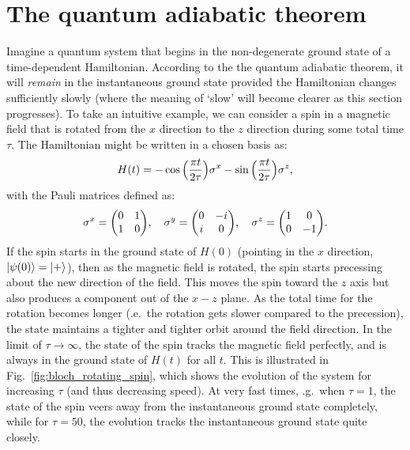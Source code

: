     \section{The quantum adiabatic theorem}\label{sec:2.1_adiabatic_theorem}
    
    Imagine a quantum system that begins in the non-degenerate ground state of a time-dependent Hamiltonian. According to the the quantum adiabatic theorem, it will \emph{remain} in the instantaneous ground state provided the Hamiltonian changes sufficiently slowly (where the meaning of `slow' will become clearer as this section progresses). To take an intuitive example, we can consider a spin in a magnetic field that is rotated from the $x$ direction to the $z$ direction during some total time $\tau$. The Hamiltonian might be written in a chosen basis as:
    \begin{equation}\label{eq:rotating_spin_H}
        H(t) = -\cos\Big(\frac{\pi t}{2 \tau}\Big)\sigma^x - \sin \Big(\frac{\pi t}{2 \tau}\Big)\sigma^z,
    \end{equation}
    with the Pauli matrices defined as:
    \begin{equation}
        \sx = \mqty(0 & 1 \\ 1 & 0), \quad \sy = \mqty(0 & -i \\ i & 0), \quad \sz = \mqty(1 & 0 \\ 0 & -1).  
    \end{equation}
    If the spin starts in the ground state of $H(0)$ (pointing in the $x$ direction, $\ket{\psi(0)} = \ket{+}$), then as the magnetic field is rotated, the spin starts precessing about the new direction of the field. This moves the spin toward the $z$ axis but also produces a component out of the $x-z$ plane. As the total time for the rotation becomes longer (\@i.e.~the rotation gets slower compared to the precession), the state maintains a tighter and tighter orbit around the field direction. In the limit of $\tau \rightarrow \infty$, the state of the spin tracks the magnetic field perfectly, and is always in the ground state of $H(t)$ for all $t$. This is illustrated in Fig.~\ref{fig:bloch_rotating_spin}, which shows the evolution of the system for increasing $\tau$ (and thus decreasing speed). At very fast times, \@e.g.~when $\tau = 1$, the state of the spin veers away from the instantaneous ground state completely, while for $\tau = 50$, the evolution tracks the instantaneous ground state quite closely.
    
